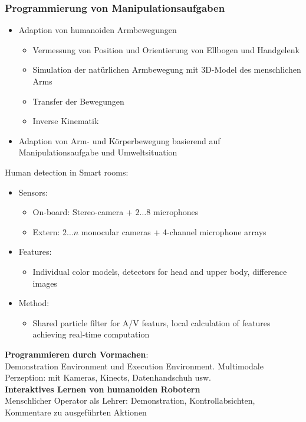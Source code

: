 \subsubsection{Programmierung von Manipulationsaufgaben}
\begin{itemize}
	\item Adaption von humanoiden Armbewegungen
	\begin{itemize}
		\item Vermessung von Position und Orientierung von Ellbogen und Handgelenk
		\item Simulation der natürlichen Armbewegung mit 3D-Model des menschlichen Arms
		\item Transfer der Bewegungen
		\item Inverse Kinematik
	\end{itemize}
	\item Adaption von Arm- und Körperbewegung basierend auf Manipulationsaufgabe und Umweltsituation
\end{itemize}
Human detection in Smart rooms:
\begin{itemize}
	\item Sensors:
	\begin{itemize}
		\item On-board: Stereo-camera + $2 \ldots 8$ microphones
		\item Extern: $2 \ldots n$ monocular cameras + 4-channel microphone arrays
	\end{itemize}
	\item Features:
	\begin{itemize}
		\item Individual color models, detectors for head and upper body, difference images
	\end{itemize}
	\item Method:
	\begin{itemize}
		\item Shared particle filter for A/V featurs, local calculation of features achieving real-time computation
	\end{itemize}
\end{itemize}
\textbf{Programmieren durch Vormachen}:\\
Demonstration Environment und Execution Environment. Multimodale Perzeption: mit Kameras, Kinects, Datenhandschuh usw.\\
\textbf{Interaktives Lernen von humanoiden Robotern}\\
Menschlicher Operator als Lehrer: Demonstration, Kontrollabsichten, Kommentare zu ausgeführten Aktionen\\
